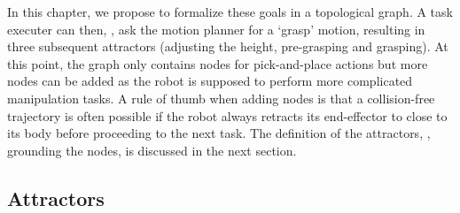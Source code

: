 In this chapter, we propose to formalize these goals in a topological graph. A task executer can then, \eg, ask the motion planner for a `grasp' motion, resulting in three subsequent attractors (adjusting the height, pre-grasping and grasping). 
At this point, the graph only contains nodes for pick-and-place actions but more nodes can be added as the robot is supposed to perform more complicated manipulation tasks. A rule of thumb when adding nodes is that a collision-free trajectory is often possible if the robot always retracts its end-effector to close to its body before proceeding to the next task. The definition of the attractors, \ie, grounding the nodes, is discussed in the next section.

\subsection{Attractors}\label{wbp:ssec:constraints}
